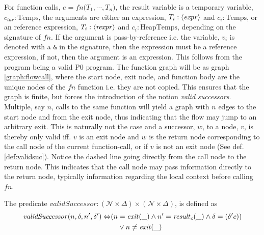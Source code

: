 For function calls, $e = \mathit{fn}\texttt{(}T_1,\cdots, T_n\texttt{)}$, the result variable is a temporary variable, $c_{tar}:\text{Temps}$, the arguments are either an expression, $T_i : \langle\mathit{expr}\rangle$ and $c_i : \text{Temps}$, or an reference expression, $T_i : \langle\mathit{rexpr}\rangle$ and $c_i : \text{HeapTemps}$, depending on the signature of $\mathit{fn}$. If the argument is pass-by-reference i.e. the variable, $v_i$ is denoted with a \texttt{\&} in the signature, then the expression must be a reference expression, if not, then the argument is an expression. This follows from the program being a valid P0 program. The function graph will be as graph \ref{graph:flowcall}, where the start node, exit node, and function body are the unique nodes of the $\mathit{fn}$ function i.e. they are not copied. This ensures that the graph is finite, but forces the introduction of the notion \emph{valid successors}. Multiple, say $n$, calls to the same function will yield a graph with $n$ edges to the start node and from the exit node, thus indicating that the flow may jump to an arbitrary exit. This is naturally not the case and a successor, $w$, to a node, $v$, is thereby only valid iff. $v$ is an exit node and $w$ is the return node corresponding to the call node of the current function-call, or if $v$ is not an exit node (See def. \ref{def:validsuc}). Notice the dashed line going directly from the call node to the return node. This indicates that the call node may pass information directly to the return node, typically information regarding the local context before calling $\mathit{fn}$.
\begin{definition}
\label{def:validsuc}
The predicate $\mathit{validSuccessor} : (\mathcal{N}\times \Delta) \times (\mathcal{N} \times \Delta)$, is defined as
\begin{align}
\mathit{validSuccessor}(n, \delta, n', \delta') \Leftrightarrow &(n = \mathit{exit}(\_) \wedge n' = \mathit{result}_c(\_) \wedge \delta  = (\delta' c)) \notag\\
&\quad\vee n \neq \mathit{exit}(\_)
\end{align}
\end{definition}

